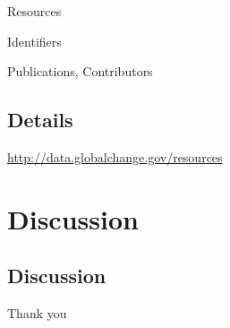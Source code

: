 \documentclass{beamer}
\begin{document}
\begin{frame}
    \begin{center}
        \Huge Resources
    \end{center}
\end{frame}

\begin{frame}
    \begin{center}
        \Huge Identifiers
    \end{center}
\end{frame}

\begin{frame}
    \begin{center}
        \Huge Publications, Contributors
    \end{center}
\end{frame}

\subsection{Details}
\begin{frame}
    \begin{center}
        \url{http://data.globalchange.gov/resources}
    \end{center}
\end{frame}

\section{Discussion}
\subsection{Discussion}
\begin{frame}
    \begin{center}
        Thank you
    \end{center}
\end{frame}
\end{document}
